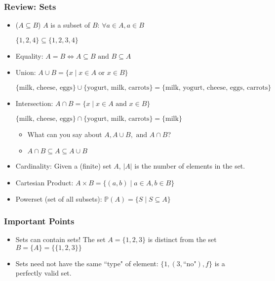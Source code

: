 \documentclass{beamer}
\begin{document}
\begin{frame}
  \frametitle{Review: Sets}

  \begin{itemize}[<+->]
    \item ($A \subseteq B$) $A$ is a subset of $B$: $\forall a \in A, a \in B$
    
    $\{1, 2, 4\} \subseteq \{1, 2, 3, 4\}$
    \item Equality: $A = B \Longleftrightarrow A \subseteq B \text{ and } B \subseteq A$

    \item Union: $A \cup B = \{x \mid x \in A \text{ or } x \in B\}$
    
    $\{\text{milk, cheese, eggs}\} \cup \{\text{yogurt, milk, carrots}\} = \{\text{milk, yogurt, cheese, eggs, carrots}\}$

    \item Intersection: $A \cap B = \{x \mid x \in A \text{ and } x \in B\}$
    
    $\{\text{milk, cheese, eggs}\} \cap \{\text{yogurt, milk, carrots}\} = \{\text{milk}\}$

    \begin{itemize}[<+->]
      \item What can you say about $A, A \cup B, \text{ and } A \cap B$?
      \item $A \cap B \subseteq A \subseteq A \cup B$
    \end{itemize}
    \item Cardinality: Given a (finite) set $A$, $|A|$ is the number of elements in the set.
    \item Cartesian Product: $A \times B = \{(a, b) \mid a \in A, b \in B\}$
    \item Powerset (set of all subsets): $\mathbb{P}(A) = \{S \mid S \subseteq A\}$
  \end{itemize}

\end{frame}

\begin{frame}
  \frametitle{Important Points}
  \begin{itemize}[<+->]
    \item Sets can contain sets! The set $A = \{1, 2, 3\}$ is distinct from the set $B = \{A\} = \{\{1, 2, 3\}\}$
    \item Sets need not have the same ``type" of element: $\{1, (3, \text{``no"}), f\}$ is a perfectly valid set.
  \end{itemize}
\end{frame}
\end{document}
